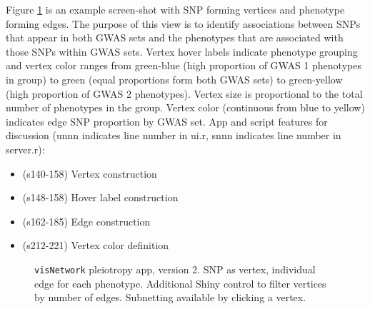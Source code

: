 \documentclass[10pt, letterpaper]{article}
\begin{document}
\begin{spacing}{1.0}
Figure \ref{fg:visNetworkAppV2b} is an example screen-shot with SNP forming vertices and phenotype forming edges.  The purpose of this view is to identify associations between SNPs that appear in both GWAS sets and the phenotypes that are associated with those SNPs within GWAS sets.  Vertex hover labels indicate phenotype grouping and vertex color ranges from green-blue (high proportion of GWAS 1 phenotypes in group) to green (equal proportions form both GWAS sets) to green-yellow (high proportion of GWAS 2 phenotypes).  Vertex size is proportional to the total number of phenotypes in the group.  Vertex color (continuous from blue to yellow) indicates edge SNP proportion by GWAS set.  App and script features for discussion (unnn indicates line number in ui.r, snnn  indicates line number in server.r):

\begin{itemize}
  \item (s140-158) Vertex construction
  \item (s148-158) Hover label construction
  \item (s162-185) Edge construction
  \item (s212-221) Vertex color definition
\end{itemize}

\vspace{0.25in}

\begin{figure}[H]
    \centering
    \caption{\texttt{visNetwork} pleiotropy app, version 2.  SNP as vertex, individual edge for each phenotype.  Additional Shiny control to filter vertices by number of edges.  Subnetting available by clicking a vertex.}
    \label{fg:visNetworkAppV2b}
\end{figure}


\end{spacing}
\end{document}
